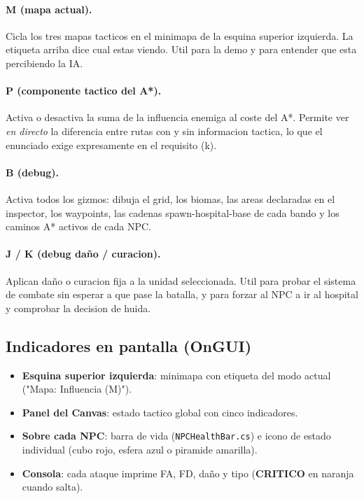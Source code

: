 \documentclass[12pt,a4paper]{article}
\begin{document}
\paragraph{M (mapa actual).}
Cicla los tres mapas tacticos en el minimapa de la esquina superior
izquierda. La etiqueta arriba dice cual estas viendo. Util para la
demo y para entender que esta percibiendo la IA.

\paragraph{P (componente tactico del A*).}
Activa o desactiva la suma de la influencia enemiga al coste del A*.
Permite ver \emph{en directo} la diferencia entre rutas con y sin
informacion tactica, lo que el enunciado exige expresamente en el
requisito (k).

\paragraph{B (debug).}
Activa todos los gizmos: dibuja el grid, los biomas, las areas
declaradas en el inspector, los waypoints, las cadenas
spawn-hospital-base de cada bando y los caminos A* activos de cada
NPC.

\paragraph{J / K (debug daño / curacion).}
Aplican daño o curacion fija a la unidad seleccionada. Util para
probar el sistema de combate sin esperar a que pase la batalla, y
para forzar al NPC a ir al hospital y comprobar la decision de huida.

\subsection{Indicadores en pantalla (OnGUI)}

\begin{itemize}[leftmargin=1.5em]
    \item \textbf{Esquina superior izquierda}: minimapa con etiqueta del modo actual ("Mapa: Influencia (M)").
    \item \textbf{Panel del Canvas}: estado tactico global con cinco indicadores.
    \item \textbf{Sobre cada NPC}: barra de vida (\texttt{NPCHealthBar.cs}) e icono de estado individual (cubo rojo, esfera azul o piramide amarilla).
    \item \textbf{Consola}: cada ataque imprime FA, FD, daño y tipo (\textbf{CRITICO} en naranja cuando salta).
\end{itemize}
\end{document}

